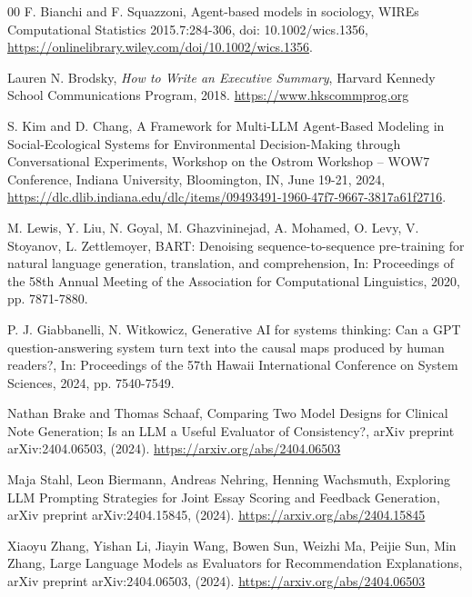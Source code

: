 \documentclass[preprint,12pt]{elsarticle}
\begin{document}
\begin{thebibliography}{00}
F. Bianchi and F. Squazzoni,
Agent-based models in sociology,
WIREs Computational Statistics 2015.7:284-306,
doi: 10.1002/wics.1356,
\href{https://onlinelibrary.wiley.com/doi/10.1002/wics.1356}{https://onlinelibrary.wiley.com/doi/10.1002/wics.1356}.

Lauren N. Brodsky,
\textit{How to Write an Executive Summary},
Harvard Kennedy School Communications Program, 2018.
\href{https://www.hkscommprog.org}{https://www.hkscommprog.org}


S. Kim and D. Chang,
A Framework for Multi-LLM Agent-Based Modeling in Social-Ecological Systems for Environmental Decision-Making through Conversational Experiments,
Workshop on the Ostrom Workshop – WOW7 Conference, Indiana University, Bloomington, IN, June 19-21, 2024,
\href{https://dlc.dlib.indiana.edu/dlc/items/09493491-1960-47f7-9667-3817a61f2716}{https://dlc.dlib.indiana.edu/dlc/items/09493491-1960-47f7-9667-3817a61f2716}.


M. Lewis, Y. Liu, N. Goyal, M. Ghazvininejad, A. Mohamed, O. Levy, V. Stoyanov, L. Zettlemoyer,
BART: Denoising sequence-to-sequence pre-training for natural language generation, translation, and comprehension,
In: Proceedings of the 58th Annual Meeting of the Association for Computational Linguistics, 2020, pp. 7871-7880.

P. J. Giabbanelli, N. Witkowicz,
Generative AI for systems thinking: Can a GPT question-answering system turn text into the causal maps produced by human readers?,
In: Proceedings of the 57th Hawaii International Conference on System Sciences, 2024, pp. 7540-7549.

Nathan Brake and Thomas Schaaf,
Comparing Two Model Designs for Clinical Note Generation; Is an LLM a Useful Evaluator of Consistency?,
arXiv preprint arXiv:2404.06503, (2024).
\href{https://arxiv.org/abs/2404.06503}{https://arxiv.org/abs/2404.06503}

Maja Stahl, Leon Biermann, Andreas Nehring, Henning Wachsmuth,
Exploring LLM Prompting Strategies for Joint Essay Scoring and Feedback Generation,
arXiv preprint arXiv:2404.15845, (2024).
\href{https://arxiv.org/abs/2404.15845}{https://arxiv.org/abs/2404.15845}


Xiaoyu Zhang, Yishan Li, Jiayin Wang, Bowen Sun, Weizhi Ma, Peijie Sun, Min Zhang,
Large Language Models as Evaluators for Recommendation Explanations,
arXiv preprint arXiv:2404.06503, (2024).
\href{https://arxiv.org/abs/2404.06503}{https://arxiv.org/abs/2404.06503}


\end{thebibliography}
\end{document}
